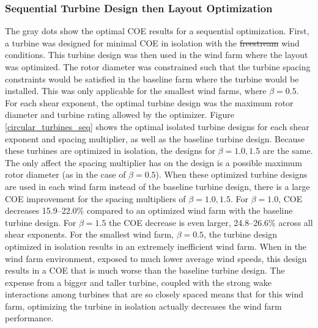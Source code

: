 \documentclass[wes, manuscript]{copernicus}
\providecommand{\DIFadd}[1]{{\protect\color{blue}\uwave{#1}}} %
\providecommand{\DIFdel}[1]{{\protect\color{red}\sout{#1}}}                      %
\providecommand{\DIFaddbegin}{} %
\providecommand{\DIFaddend}{} %
\providecommand{\DIFdelbegin}{} %
\providecommand{\DIFdelend}{} %
\begin{document}
\subsubsection{\DIFaddbegin \DIFadd{Circular Wind Farm: }\DIFaddend Sequential Turbine Design then Layout Optimization}
The gray dots \DIFaddbegin \DIFadd{in Fig. \ref{circular_results} }\DIFaddend show the optimal COE results for a sequential optimization. First, a turbine was designed for minimal COE in isolation with the \DIFdelbegin \DIFdel{freestream }\DIFdelend \DIFaddbegin \DIFadd{free stream }\DIFaddend wind conditions. This turbine design was then used in the wind farm where the layout was optimized. 
The rotor diameter was constrained such that the turbine spacing constraints would be satisfied in the baseline farm where the turbine would be installed. This was only applicable for the smallest wind farms, where $\beta=0.5$. 
For each shear exponent, the optimal turbine design was the maximum rotor diameter and turbine rating allowed by the optimizer.
Figure \ref{circular_turbines_seq} shows the optimal isolated turbine designs for each shear exponent and spacing multiplier, as well as the baseline turbine design. Because these turbines are optimized in isolation, the designs for $\beta=1.0,1.5$ are the same. The only affect the spacing multiplier has on the design is a possible maximum rotor diameter (as in the case of $\beta=0.5$).
When these optimized turbine designs are used in each wind farm instead of the baseline turbine design, there is a large COE improvement for the spacing multipliers of $\beta=1.0, 1.5$. For $\beta=1.0$, COE decreases 15.9--22.0\% compared to an optimized wind farm with the baseline turbine design. For $\beta=1.5$ the COE decrease is even larger, 24.8--26.6\% across all shear exponents. 
For the smallest wind farm, $\beta=0.5$, the turbine design optimized in isolation results in an extremely inefficient wind farm. When in the wind farm environment, exposed to much lower average wind speeds, this design results in a COE that is much worse than the baseline turbine design. The expense from a bigger and taller turbine, coupled with the strong wake interactions among turbines that are so closely spaced means that for this wind farm, optimizing the turbine in isolation actually decreases the wind farm performance. 
\end{document}
